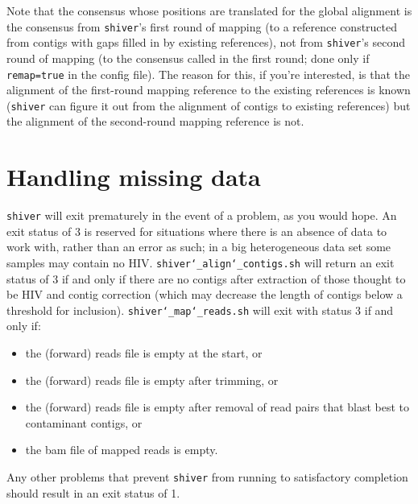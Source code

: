 \documentclass{article}
\newcommand{\shiv}{\c{shiver}\xspace}
\newcommand{\sac}{\c{shiver\char`_align\char`_contigs.sh}\xspace}
\newcommand{\smr}{\c{shiver\char`_map\char`_reads.sh}\xspace}
\let\c\texttt
\begin{document}
Note that the consensus whose positions are translated for the global alignment is the consensus from \shiv's first round of mapping (to a reference constructed from contigs with gaps filled in by existing references), not from \shiv's second round of mapping (to the consensus called in the first round; done only if \c{remap=true} in the config file).
The reason for this, if you're interested, is that the alignment of the first-round mapping reference to the existing references is known (\shiv can figure it out from the alignment of contigs to existing references) but the alignment of the second-round mapping reference is not.

\section{Handling missing data} \label{sec:ContiglessSamples}

\shiv will exit prematurely in the event of a problem, as you would hope.
An exit status of 3 is reserved for situations where there is an absence of data to work with, rather than an error as such; in a big heterogeneous data set some samples may contain no HIV.
\sac will return an exit status of 3 if and only if there are no contigs after extraction of those thought to be HIV and contig correction (which may decrease the length of contigs below a threshold for inclusion).
\smr will exit with status 3 if and only if:
\begin{itemize}
\item the (forward) reads file is empty at the start, or
\item the (forward) reads file is empty after trimming, or
\item the (forward) reads file is empty after removal of read pairs that blast best to contaminant contigs, or
\item the bam file of mapped reads is empty.
\end{itemize}
Any other problems that prevent \shiv from running to satisfactory completion should result in an exit status of 1.
\end{document}
